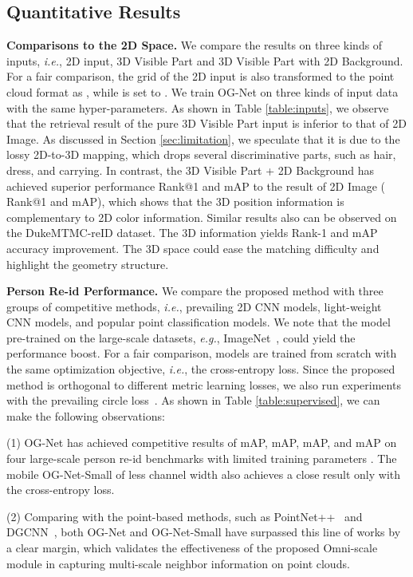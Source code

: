 \documentclass[journal]{IEEEtran}
\def\eg{\emph{e.g.}}
\def\ie{\emph{i.e.}}
\begin{document}
\subsection{Quantitative Results}

\noindent\textbf{Comparisons to the 2D Space.} We compare the results on three kinds of inputs, \ie, 2D input, 3D Visible Part and 3D Visible Part with 2D Background. For a fair comparison, the grid of the 2D input is also transformed to the point cloud format as , while  is set to . We train OG-Net on three kinds of input data with the same hyper-parameters. As shown in Table \ref{table:inputs}, we observe that the retrieval result of the pure 3D Visible Part input is inferior to that of 2D Image. As discussed in Section \ref{sec:limitation}, we speculate that it is  due to the lossy 2D-to-3D mapping, which drops several discriminative parts, such as hair, dress, and carrying. 
In contrast, the 3D Visible Part + 2D Background has achieved superior performance  Rank@1 and  mAP to the result of 2D Image ( Rank@1 and  mAP), which shows that the 3D position information is complementary to 2D color information.  Similar results also can be observed on the DukeMTMC-reID dataset. The 3D information yields  Rank-1 and  mAP accuracy improvement. The 3D space could ease the matching difficulty and highlight the geometry structure. 

\noindent\textbf{Person Re-id Performance.}
We compare the proposed method with three groups of competitive methods, \ie, prevailing 2D CNN models, light-weight CNN models, and  popular point classification models. 
We note that the model pre-trained on the large-scale datasets, \eg, ImageNet~\cite{deng2009imagenet}, could yield the performance boost. For a fair comparison, models are trained from scratch with the same optimization objective, \ie, the cross-entropy loss. Since the proposed method is orthogonal to different metric learning losses, we also run experiments with the prevailing circle loss~\cite{sun2020circle}.  As shown in Table \ref{table:supervised}, we can make the following observations: 

(1) OG-Net has achieved competitive results of  mAP,  mAP,  mAP, and  mAP on four large-scale person re-id benchmarks with limited training parameters . The mobile OG-Net-Small of less channel width also achieves a close result only with the cross-entropy loss. 

(2) Comparing with the point-based methods, such as PointNet++~\cite{qi2017pointnet++} and DGCNN~\cite{wang2019dynamic}, both OG-Net and OG-Net-Small have surpassed this line of works by a clear margin, which validates the effectiveness of the proposed Omni-scale module in capturing multi-scale neighbor information on point clouds. 
\end{document}
